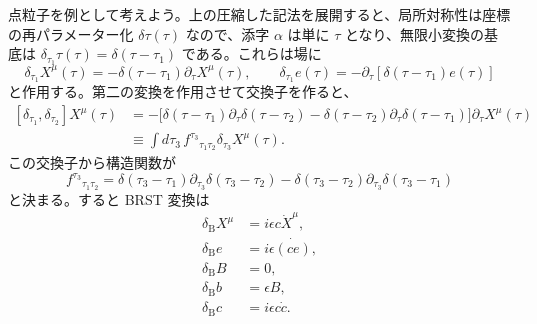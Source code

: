 点粒子を例として考えよう。上の圧縮した記法を展開すると、局所対称性は座標の再パラメーター化 $\delta\tau(\tau)$ なので、添字 $\alpha$ は単に $\tau$ となり、無限小変換の基底は $\delta_{\tau_1}\tau(\tau)=\delta(\tau-\tau_1)$ である。これらは場に
\begin{equation}
\delta_{\tau_1}X^\mu(\tau)=-\delta(\tau-\tau_1)\partial_\tau X^\mu(\tau),
\qquad
\delta_{\tau_1}e(\tau)=-\partial_\tau[\delta(\tau-\tau_1)e(\tau)]
\tag{4.2.19}\label{eq:4.2.19}
\end{equation}
と作用する。第二の変換を作用させて交換子を作ると、
\begin{equation}
\begin{aligned}
[\delta_{\tau_1},\delta_{\tau_2}]X^\mu(\tau)
&=-\bigl[\delta(\tau-\tau_1)\partial_\tau\delta(\tau-\tau_2)
-\delta(\tau-\tau_2)\partial_\tau\delta(\tau-\tau_1)\bigr]\partial_\tau X^\mu(\tau)\\
&\equiv\int d\tau_3\,f^{\tau_3}{}_{\tau_1\tau_2}\delta_{\tau_3}X^\mu(\tau).
\end{aligned}
\tag{4.2.20}\label{eq:4.2.20}
\end{equation}
この交換子から構造関数が
\begin{equation}
f^{\tau_3}{}_{\tau_1\tau_2}
=\delta(\tau_3-\tau_1)\partial_{\tau_3}\delta(\tau_3-\tau_2)
-\delta(\tau_3-\tau_2)\partial_{\tau_3}\delta(\tau_3-\tau_1)
\tag{4.2.21}\label{eq:4.2.21}
\end{equation}
と決まる。すると BRST 変換は
\begin{align}
\delta_{\mathrm B}X^\mu&=i\epsilon c\dot X^\mu,
\tag{4.2.22a}\label{eq:4.2.22a}\\
\delta_{\mathrm B}e&=i\epsilon\dot{(ce)},
\tag{4.2.22b}\label{eq:4.2.22b}\\
\delta_{\mathrm B}B&=0,
\tag{4.2.22c}\label{eq:4.2.22c}\\
\delta_{\mathrm B}b&=\epsilon B,
\tag{4.2.22d}\label{eq:4.2.22d}\\
\delta_{\mathrm B}c&=i\epsilon c\dot c.
\tag{4.2.22e}\label{eq:4.2.22e}
\end{align}

